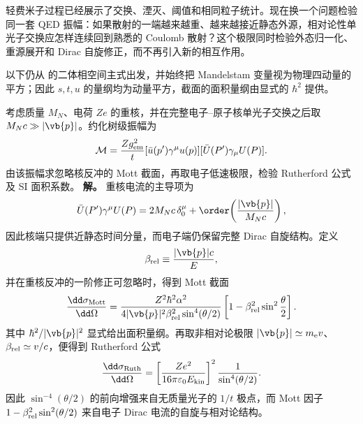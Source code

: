 
轻费米子过程已经展示了交换、湮灭、阈值和相同粒子统计。现在换一个问题检验同一套 QED 振幅：如果散射的一端越来越重、越来越接近静态外源，相对论性单光子交换应怎样连续回到熟悉的 Coulomb 散射？这个极限同时检验外态归一化、重源展开和 Dirac 自旋修正，而不再引入新的相互作用。

以下仍从 的二体相空间主式出发，并始终把 Mandelstam 变量视为物理四动量的平方；因此 $s,t,u$ 的量纲均为动量平方，截面的面积量纲由显式的 $\hbar^2$ 提供。

\begin{exbox}
考虑质量 $M_N$、电荷 $Ze$ 的重核，并在完整电子--原子核单光子交换之后取 $M_Nc\gg |\vb{p}|$。约化树级振幅为
\begin{equation}
 \mathcal M
 =\frac{Zg_{\rm em}^2}{t}
 [\bar u(p')\gamma^\mu u(p)]
 [\bar U(P')\gamma_\mu U(P)].
 \label{eq:mott-reduced-amplitude-si-r10}
\end{equation}
由该振幅求忽略核反冲的 Mott 截面，再取电子低速极限，检验 Rutherford 公式及 SI 面积系数。
\textbf{解。} 重核电流的主导项为
\begin{equation}
 \bar U(P')\gamma^\mu U(P)
 =2M_Nc\,\delta_0^\mu
 +\order\!\left(\frac{|\vb{p}|}{M_Nc}\right),
 \label{eq:heavy-nucleus-current-si-r10}
\end{equation}
因此核端只提供近静态时间分量，而电子端仍保留完整 Dirac 自旋结构。定义
\begin{equation*}
 \beta_{\rm rel}\equiv\frac{|\vb{p}|c}{E},
\end{equation*}
并在重核反冲的一阶修正可忽略时，得到 Mott 截面
\begin{equation}
 {
 \frac{\dd\sigma_{\rm Mott}}{\dd\Omega}
 =\frac{Z^2\hbar^2\alpha^2}
 {4|\vb{p}|^2\beta_{\rm rel}^2\sin^4(\theta/2)}
 \left[1-\beta_{\rm rel}^2\sin^2\frac\theta2\right].}
 \label{eq:mott-cross-section-si-r10}
\end{equation}
其中 $\hbar^2/|\vb{p}|^2$ 显式给出面积量纲。再取非相对论极限 $|\vb{p}|\simeq m_{\mathrm e} v$、$\beta_{\rm rel}\simeq v/c$，便得到 Rutherford 公式
\begin{equation}
 {
 \frac{\dd\sigma_{\rm Ruth}}{\dd\Omega}
 =\left[
 \frac{Ze^2}{16\pi\varepsilon_0E_{\rm kin}}
 \right]^2
 \frac1{\sin^4(\theta/2)}.}
 \label{eq:rutherford-SI-r10}
\end{equation}
因此 $\sin^{-4}(\theta/2)$ 的前向增强来自无质量光子的 $1/t$ 极点，而 Mott 因子 $1-\beta_{\rm rel}^2\sin^2(\theta/2)$ 来自电子 Dirac 电流的自旋与相对论结构。



\end{exbox}
